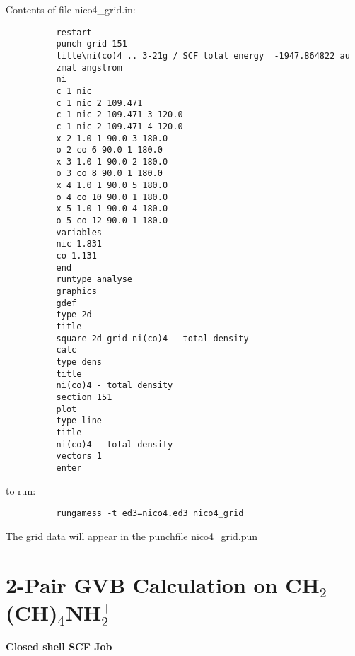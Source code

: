 \documentclass[11pt,fleqn]{article}
\begin{document}
Contents of file nico4\_grid.in:
{
\footnotesize
\begin{verbatim}
          restart
          punch grid 151
          title\ni(co)4 .. 3-21g / SCF total energy  -1947.864822 au
          zmat angstrom
          ni
          c 1 nic
          c 1 nic 2 109.471
          c 1 nic 2 109.471 3 120.0
          c 1 nic 2 109.471 4 120.0
          x 2 1.0 1 90.0 3 180.0
          o 2 co 6 90.0 1 180.0
          x 3 1.0 1 90.0 2 180.0
          o 3 co 8 90.0 1 180.0
          x 4 1.0 1 90.0 5 180.0
          o 4 co 10 90.0 1 180.0
          x 5 1.0 1 90.0 4 180.0
          o 5 co 12 90.0 1 180.0
          variables
          nic 1.831
          co 1.131
          end
          runtype analyse
          graphics
          gdef
          type 2d
          title
          square 2d grid ni(co)4 - total density
          calc
          type dens 
          title
          ni(co)4 - total density
          section 151
          plot
          type line 
          title
          ni(co)4 - total density
          vectors 1
          enter
\end{verbatim}
}
to run:
{
\footnotesize
\begin{verbatim}
          rungamess -t ed3=nico4.ed3 nico4_grid
\end{verbatim}
}
The grid data will appear in the punchfile nico4\_grid.pun

\section[2-Pair GVB Calculation on CH$_{2}$(CH)$_{4}$NH$_{2}^{+}$]{2-Pair GVB Calculation on CH$_{2}$(CH)$_{4}$NH$_{2}^{+}$}

{\bf Closed shell SCF Job}\\
\end{document}
